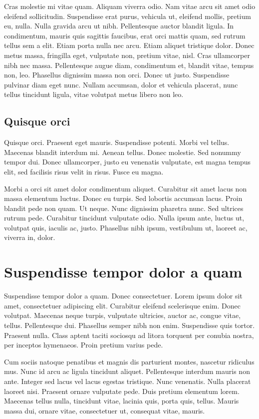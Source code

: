 \documentclass{cascadilla}
\begin{document}
Cras molestie mi vitae quam. Aliquam viverra odio. Nam vitae arcu sit amet
odio eleifend sollicitudin. Suspendisse erat purus, vehicula ut, eleifend
mollis, pretium eu, nulla. Nulla gravida arcu ut nibh. Pellentesque auctor
blandit ligula. In condimentum, mauris quis sagittis faucibus, erat orci
mattis quam, sed rutrum tellus sem a elit. Etiam porta nulla nec arcu. Etiam
aliquet tristique dolor. Donec metus massa, fringilla eget, vulputate non,
pretium vitae, nisl. Cras ullamcorper nibh nec massa. Pellentesque augue diam,
condimentum et, blandit vitae, tempus non, leo. Phasellus dignissim massa non
orci. Donec ut justo. Suspendisse pulvinar diam eget nunc. Nullam accumsan,
dolor et vehicula placerat, nunc tellus tincidunt ligula, vitae volutpat metus
libero non leo.

\subsection{Quisque orci}
Quisque orci. Praesent eget mauris. Suspendisse potenti. Morbi vel tellus.
Maecenas blandit interdum mi. Aenean tellus. Donec molestie. Sed nonummy
tempor dui. Donec ullamcorper, justo eu venenatis vulputate, est magna tempus
elit, sed facilisis risus velit in risus. Fusce eu magna.

Morbi a orci sit amet dolor condimentum aliquet. Curabitur sit amet lacus non
massa elementum luctus. Donec eu turpis. Sed lobortis accumsan lacus. Proin
blandit pede non quam. Ut neque. Nunc dignissim pharetra nunc. Sed ultrices
rutrum pede. Curabitur tincidunt vulputate odio. Nulla ipsum ante, luctus ut,
volutpat quis, iaculis ac, justo. Phasellus nibh ipsum, vestibulum ut, laoreet
ac, viverra in, dolor.

\section{Suspendisse tempor dolor a quam}
Suspendisse tempor dolor a quam. Donec consectetuer. Lorem ipsum dolor sit
amet, consectetuer adipiscing elit. Curabitur eleifend scelerisque enim. Donec
volutpat. Maecenas neque turpis, vulputate ultricies, auctor ac, congue vitae,
tellus. Pellentesque dui. Phasellus semper nibh non enim. Suspendisse quis
tortor. Praesent nulla. Class aptent taciti sociosqu ad litora torquent per
conubia nostra, per inceptos hymenaeos. Proin pretium varius pede.

Cum sociis natoque penatibus et magnis dis parturient montes, nascetur
ridiculus mus. Nunc id arcu ac ligula tincidunt aliquet. Pellentesque interdum
mauris non ante. Integer sed lacus vel lacus egestas tristique. Nunc
venenatis. Nulla placerat laoreet nisi. Praesent ornare vulputate pede. Duis
pretium elementum lorem. Maecenas tellus nulla, tincidunt vitae, lacinia quis,
porta quis, tellus. Mauris massa dui, ornare vitae, consectetuer ut, consequat
vitae, mauris.
\end{document}
